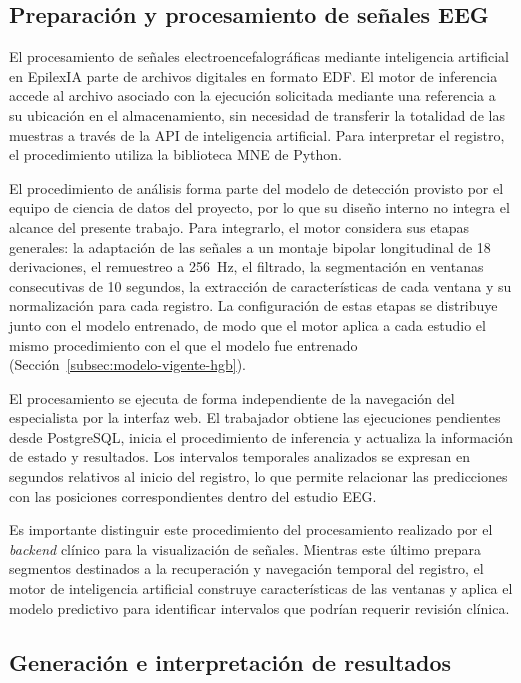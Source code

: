 \subsection{Preparación y procesamiento de señales EEG}
\label{subsec:preparacion-procesamiento-eeg-ia}

El procesamiento de señales electroencefalográficas mediante inteligencia artificial en EpilexIA parte de archivos digitales en formato EDF. El motor de inferencia accede al archivo asociado con la ejecución solicitada mediante una referencia a su ubicación en el almacenamiento, sin necesidad de transferir la totalidad de las muestras a través de la API de inteligencia artificial. Para interpretar el registro, el procedimiento utiliza la biblioteca MNE de Python.

El procedimiento de análisis forma parte del modelo de detección provisto por el equipo de ciencia de datos del proyecto, por lo que su diseño interno no integra el alcance del presente trabajo.
Para integrarlo, el motor considera sus etapas generales: la adaptación de las señales a un montaje bipolar longitudinal de 18 derivaciones, el remuestreo a 256~Hz, el filtrado, la segmentación en ventanas consecutivas de 10 segundos, la extracción de características de cada ventana y su normalización para cada registro.
La configuración de estas etapas se distribuye junto con el modelo entrenado, de modo que el motor aplica a cada estudio el mismo procedimiento con el que el modelo fue entrenado (Sección~\ref{subsec:modelo-vigente-hgb}).

El procesamiento se ejecuta de forma independiente de la navegación del especialista por la interfaz web. El trabajador obtiene las ejecuciones pendientes desde PostgreSQL, inicia el procedimiento de inferencia y actualiza la información de estado y resultados. Los intervalos temporales analizados se expresan en segundos relativos al inicio del registro, lo que permite relacionar las predicciones con las posiciones correspondientes dentro del estudio EEG.

Es importante distinguir este procedimiento del procesamiento realizado por el \textit{backend} clínico para la visualización de señales. Mientras este último prepara segmentos destinados a la recuperación y navegación temporal del registro, el motor de inteligencia artificial construye características de las ventanas y aplica el modelo predictivo para identificar intervalos que podrían requerir revisión clínica.


\subsection{Generación e interpretación de resultados}
\label{subsec:generacion-interpretacion-resultados-ia}

